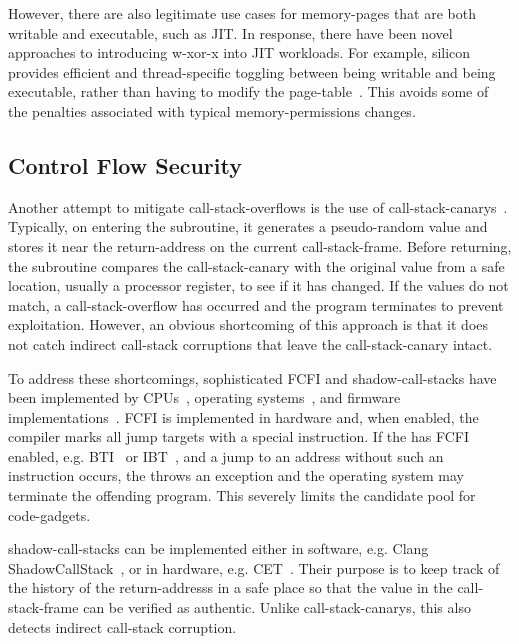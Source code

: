 However, there are also legitimate use cases for \glspl{memory-page} that are both writable and executable, such as \gls{JIT}. In response, there have been novel approaches to introducing \gls{w-xor-x} into \gls{JIT} workloads. For example,  silicon provides efficient and thread-specific toggling between being writable and being executable, rather than having to modify the \gls{page-table}~\cite{as-sec}. This avoids some of the penalties associated with typical \gls{memory-permissions} changes.

\subsection{Control Flow Security}

Another attempt to mitigate \glspl{call-stack-overflow} is the use of \glspl{call-stack-canary}~\cite{10.1007/978-3-642-33338-5_5}. Typically, on entering the subroutine, it generates a pseudo-random value and stores it near the \gls{return-address} on the current \gls{call-stack-frame}. Before returning, the subroutine compares the \gls{call-stack-canary} with the original value from a safe location, usually a processor register, to see if it has changed. If the values do not match, a \gls{call-stack-overflow} has occurred and the program terminates to prevent exploitation. However, an obvious shortcoming of this approach is that it does not catch indirect \gls{call-stack} corruptions that leave the \gls{call-stack-canary} intact.

To address these shortcomings, sophisticated \gls{FCFI} and \glspl{shadow-call-stack} have been implemented by \glspl{CPU}~\cite{ia32,arm-isa}, operating systems~\cite{linux-arm-bti}, and  firmware implementations~\cite{uefi-spec,edk2}. \Gls{FCFI} is implemented in hardware and, when enabled, the compiler marks all jump targets with a special instruction. If the  has \gls{FCFI} enabled, e.g. \gls{BTI}~\cite{arm-isa} or \gls{IBT}~\cite{ia32}, and a jump to an address without such an instruction occurs, the  throws an exception and the operating system may terminate the offending program. This severely limits the candidate pool for \glspl{code-gadget}.

\Glspl{shadow-call-stack} can be implemented either in software, e.g. Clang ShadowCallStack~\cite{clang-csc}, or in hardware, e.g.  \gls{CET}~\cite{ia32}. Their purpose is to keep track of the history of the \glspl{return-address} in a safe place so that the value in the \gls{call-stack-frame} can be verified as authentic. Unlike \glspl{call-stack-canary}, this also detects indirect \gls{call-stack} corruption.

